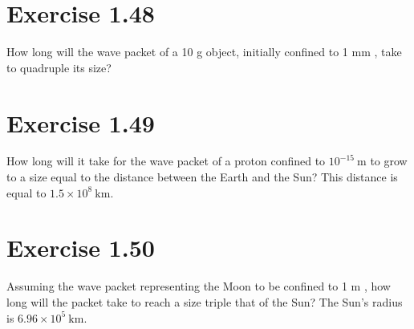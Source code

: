 \documentclass[10pt]{article}
\begin{document}
\section*{Exercise 1.48}
How long will the wave packet of a 10 g object, initially confined to 1 mm , take to quadruple its size?

\section*{Exercise 1.49}
How long will it take for the wave packet of a proton confined to $10^{-15} \mathrm{~m}$ to grow to a size equal to the distance between the Earth and the Sun? This distance is equal to $1.5 \times 10^{8} \mathrm{~km}$.

\section*{Exercise 1.50}
Assuming the wave packet representing the Moon to be confined to 1 m , how long will the packet take to reach a size triple that of the Sun? The Sun's radius is $6.96 \times 10^{5} \mathrm{~km}$.
\end{document}
